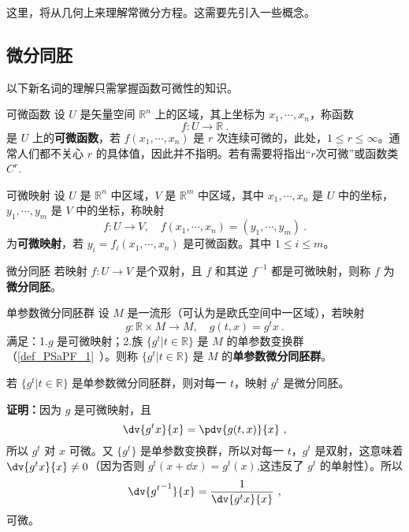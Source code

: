 

这里，将从几何上来理解常微分方程。这需要先引入一些概念。
\subsection{微分同胚}
以下新名词的理解只需掌握函数可微性的知识。
\begin{definition}{可微函数}\label{def_GofODE_2}
设 $U$ 是矢量空间 $\mathbb R^n$ 上的区域，其上坐标为 $x_1,\cdots,x_n$，称函数
\begin{equation}
f:U\rightarrow\mathbb R~.
\end{equation}
是 $U$ 上的\textbf{可微函数}，若 $f(x_1,\cdots,x_n)$ 是 $r$ 次连续可微的，此处，$1\leq r\leq\infty$。通常人们都不关心 $r$ 的具体值，因此并不指明。若有需要将指出“$r$次可微”或函数类 $C^r$.
\end{definition}
\begin{definition}{可微映射}
设 $U$ 是 $\mathbb R^n$ 中区域，$V$ 是 $\mathbb R^m$ 中区域，其中 $x_1,\cdots,x_n$ 是 $U$ 中的坐标，$y_1,\cdots,y_m$ 是 $V$ 中的坐标，称映射
\begin{equation}
f:U\rightarrow V,\quad f(x_1,\cdots,x_n)=(y_1,\cdots,y_m)~.
\end{equation}
为\textbf{可微映射}，若 $y_i=f_i(x_1,\cdots,x_n)$ 是可微函数。其中 $1\leq i\leq m$。
\end{definition}
\begin{definition}{微分同胚}
若映射 $f:U\rightarrow V$ 是个双射，且 $f$ 和其逆 $f^{-1}$ 都是可微映射，则称 $f$ 为\textbf{微分同胚}。
\end{definition}

\begin{definition}{单参数微分同胚群}\label{def_GofODE_1}
设 $M$ 是一流形（可认为是欧氏空间中一区域），若映射
\begin{equation}
g:\mathbb R\times M\rightarrow M,\quad g(t,x) =g^t x~.
\end{equation}
满足：1.$g$ 是可微映射；2.族 $\{g^t|t\in\mathbb R\}$ 是 $M$ 的单参数变换群（\autoref{def_PSaPF_1}~）。则称 $\{g^t|t\in\mathbb R\}$ 是 $M$ 的\textbf{单参数微分同胚群}。
\end{definition}
\begin{theorem}{}
若 $\{g^t|t\in\mathbb R\}$ 是单参数微分同胚群，则对每一 $t$，映射 $g^t$ 是微分同胚。
\end{theorem}
\textbf{证明：}因为 $g$ 是可微映射，且
\begin{equation}
\dv{g^tx}{x}=\pdv{g(t,x)}{x}~,
\end{equation}
所以 $g^t$ 对 $x$ 可微。又 $\{g^t\}$ 是单参数变换群，所以对每一 $t$，$g^t$ 是双射，这意味着 $\dv{g^t x}{x}\neq 0$（因为否则 $g^t(x+\dd x)=g^t(x)$,这违反了 $g^t$ 的单射性）。所以
\begin{equation}
\dv{{g^{t}}^{-1}}{x}=\frac{1}{\dv{g^t x}{x}}~,
\end{equation}
可微。

